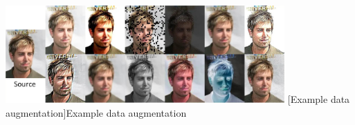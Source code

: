\documentclass[
	12pt,
    a4paper,
    egregdoesnotlikesansseriftitles, %
    toc=chapterentrywithdots,
    oneside, openany,
    titlepage,
    parskip=half,
    headings=normal,  %
    listof=totoc,
    bibliography=totocnumbered,
    index=totoc,
    captions=tableheading,  %
    listof=flat,
    numbers=noenddot, %
    final]
    {scrbook}
\begin{document}
\vspace{1em}
\begin{minipage}{\linewidth}
	\centering
	\includegraphics[width=0.8\textwidth]{figures/augmentation2.jpg}
	[Example data augmentation]{Example data augmentation \cite{singh_face_2020}}
	\label{fig:augmentation}
\end{minipage}








\backmatter


%
%
%
\printbibliography

\clearpage %




\end{document}
